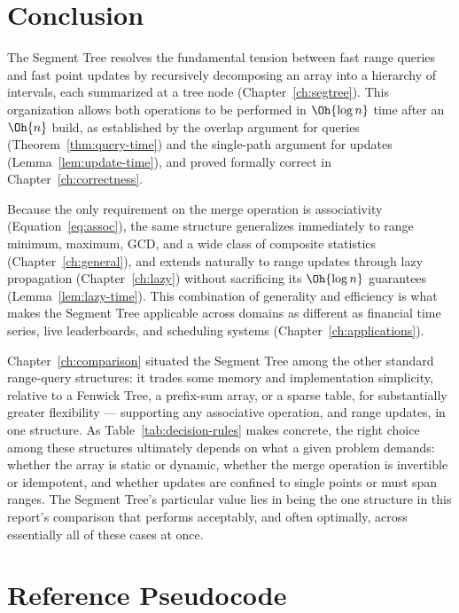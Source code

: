 \chapter{Conclusion}
\label{ch:conclusion}

The Segment Tree resolves the fundamental tension between fast range queries and fast point updates by recursively decomposing an array into a hierarchy of intervals, each summarized at a tree node (Chapter~\ref{ch:segtree}). This organization allows both operations to be performed in $\Oh{\log n}$ time after an $\Oh{n}$ build, as established by the overlap argument for queries (Theorem~\ref{thm:query-time}) and the single-path argument for updates (Lemma~\ref{lem:update-time}), and proved formally correct in Chapter~\ref{ch:correctness}.

Because the only requirement on the merge operation is associativity (Equation~\eqref{eq:assoc}), the same structure generalizes immediately to range minimum, maximum, GCD, and a wide class of composite statistics (Chapter~\ref{ch:general}), and extends naturally to range updates through lazy propagation (Chapter~\ref{ch:lazy}) without sacrificing its $\Oh{\log n}$ guarantees (Lemma~\ref{lem:lazy-time}). This combination of generality and efficiency is what makes the Segment Tree applicable across domains as different as financial time series, live leaderboards, and scheduling systems (Chapter~\ref{ch:applications}).

Chapter~\ref{ch:comparison} situated the Segment Tree among the other standard range-query structures: it trades some memory and implementation simplicity, relative to a Fenwick Tree, a prefix-sum array, or a sparse table, for substantially greater flexibility --- supporting any associative operation, and range updates, in one structure. As Table~\ref{tab:decision-rules} makes concrete, the right choice among these structures ultimately depends on what a given problem demands: whether the array is static or dynamic, whether the merge operation is invertible or idempotent, and whether updates are confined to single points or must span ranges. The Segment Tree's particular value lies in being the one structure in this report's comparison that performs acceptably, and often optimally, across essentially all of these cases at once.

\appendix
\chapter{Reference Pseudocode}

